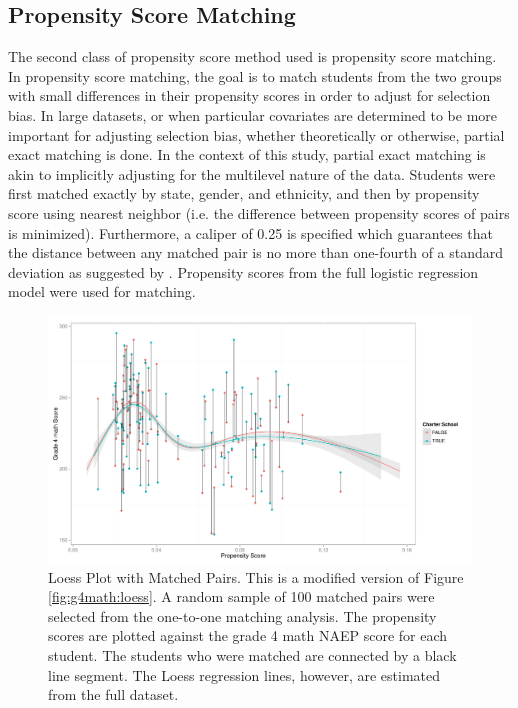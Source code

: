 \documentclass[letterpaper,12p,twoside]{article} %
\begin{document}
\clearpage




\subsection{Propensity Score Matching}

The second class of propensity score method used is propensity score matching. In propensity score matching, the goal is to match students from the two groups with small differences in their propensity scores in order to adjust for selection bias. In large datasets, or when particular covariates are determined to be more important for adjusting selection bias, whether theoretically or otherwise, partial exact matching is done. In the context of this study, partial exact matching is akin to implicitly adjusting for the multilevel nature of the data. Students were first matched exactly by state, gender, and ethnicity, and then by propensity score using nearest neighbor (i.e. the difference between propensity scores of pairs is minimized). Furthermore, a caliper of 0.25 is specified which guarantees that the distance between any matched pair is no more than one-fourth of a standard deviation as suggested by . Propensity scores from the full logistic regression model were used for matching.

\setlength{\belowcaptionskip}{-10pt}
\begin{figure}[t]
\begin{center}
\includegraphics[width=\textwidth]{../Figures2009/g4math-loess-matching.pdf}
\caption[Loess Plot with Matched Pairs]{Loess Plot with Matched Pairs. This is a modified version of Figure \ref{fig:g4math:loess}. A random sample of 100 matched pairs were selected from the one-to-one matching analysis. The propensity scores are plotted against the grade 4 math NAEP score for each student. The students who were matched are connected by a black line segment. The Loess regression lines, however, are estimated from the full dataset.}
\label{fig:g4math:loessmatching}
\end{center}
\end{figure}
\setlength{\belowcaptionskip}{0pt}
\end{document}
